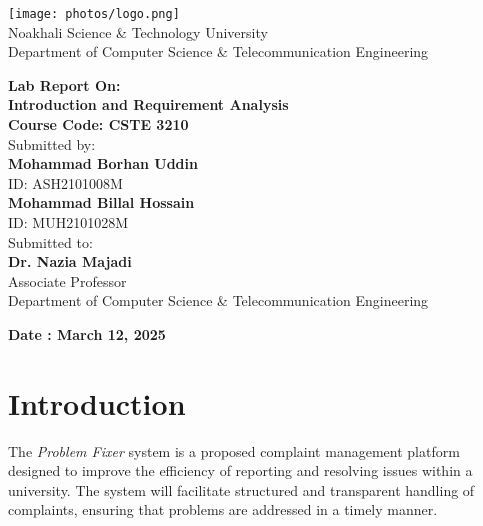 \documentclass[a4paper,12pt]{article}
\begin{document}
\thispagestyle{empty} 
\begin{center}
    \texttt{[image: photos/logo.png]}  \\[1.5em]
    {\LARGE Noakhali Science \& Technology University} \\
    Department of Computer Science \& Telecommunication Engineering
\end{center}

\vspace{4cm}

\begin{center}
    \textbf{\huge Lab Report On:} \\[0.5em]
   \textbf{\LARGE Introduction and Requirement Analysis} \\[1em]
      \textbf{\Large Course Code: CSTE 3210}  \\[1.5em]
    {\large Submitted by:} \\[0.6em]
     \textbf {\large Mohammad Borhan Uddin }  \\
  {\large ID: ASH2101008M}  \\ [0.6em]
    \textbf{\large Mohammad Billal Hossain}  \\
    {\large ID: MUH2101028M}  \\ [2em]

    
    {\large Submitted to:} \\[0.6em]
    \textbf{\large Dr. Nazia Majadi} \\ 
    {\large Associate Professor} \\ 
     {Department of Computer Science \& Telecommunication Engineering} \\ 
\end{center}

\vspace{5cm}

\begin{center}
    \textbf{\LARGE Date : March 12, 2025}
\end{center}
\thispagestyle{empty} 

\tableofcontents

\thispagestyle{empty}
\newpage

\setcounter{page}{1} 

\section{Introduction}

The \textit{Problem Fixer} system is a proposed complaint management platform designed to improve the efficiency of reporting and resolving issues within a university. The system will facilitate structured and transparent handling of complaints, ensuring that problems are addressed in a timely manner.
\end{document}

